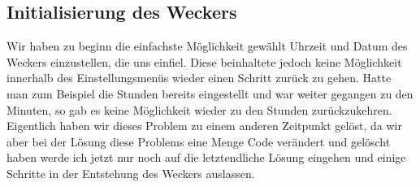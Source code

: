 \documentclass[openright,twoside,11pt,a4paper]{scrartcl}
\begin{document}
\begin{flushleft}
		 \section{Initialisierung des Weckers}
		 Wir haben zu beginn die einfachste Möglichkeit gewählt Uhrzeit und Datum des Weckers einzustellen, die uns einfiel. Diese beinhaltete jedoch keine Möglichkeit innerhalb des Einstellungsmenüs wieder einen Schritt zurück zu gehen. Hatte man zum Beispiel die Stunden bereits eingestellt und war weiter gegangen zu den Minuten, so gab es keine Möglichkeit wieder zu den Stunden zurückzukehren. Eigentlich haben wir dieses Problem zu einem anderen Zeitpunkt gelöst, da wir aber bei der Lösung diese Problems eine Menge Code verändert und gelöscht haben werde ich jetzt nur noch auf die letztendliche Lösung eingehen und einige Schritte in der Entstehung des Weckers auslassen.

\end{flushleft}
\end{document}
